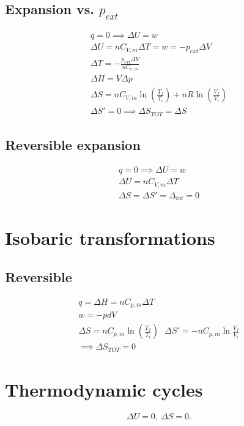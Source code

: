 \documentclass[a4paper]{report}
\begin{document}
\begin{multicols}{2}
        \subsection{Expansion vs. $p_{ext}$}
           \begin{gather*}
             q = 0 \implies \Delta U = w \\
             \Delta U = nC_{V,m} \Delta T = w = -p_{ext} \Delta V \\
             \Delta T = -\frac{p_{ext}\Delta V}{nC_{v,m}}  \\
             \Delta H = V \Delta p \\
             \Delta S = nC_{V,m} \ln (\frac{T_{f}}{T_{i}}) + nR\ln (\frac{V_f}{V_{i}})\\
             \Delta S' = 0 \implies \Delta S_{TOT}= \Delta S 
         \end{gather*}
        \subsection{Reversible expansion}
          \begin{gather*}
            q = 0 \implies \Delta U = w \\
            \Delta U = nC_{V,m} \Delta T\\
            \Delta S = \Delta S' = \Delta _{tot} = 0
          \end{gather*}
      \section{Isobaric transformations}
      \subsection{Reversible}
        \begin{gather*}
          q = \Delta H = nC_{p,m}\Delta T\\
          w = -pdV\\
          \Delta S = n C_{p,m} \ln (\frac{T_f}{T_i}) ~ ~ ~ \Delta S' = -nC_{p,m} \ln \frac{V_{f} }{V_{i}}\\
          \implies \Delta S_{TOT} = 0 
        \end{gather*} 

    \section{Thermodynamic cycles}
    \[
      \Delta U = 0, ~ \Delta S = 0
    .\] 


\end{multicols}
\end{document}
